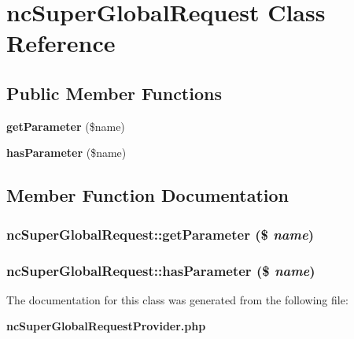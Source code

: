 \section{ncSuperGlobalRequest Class Reference}
\label{classncSuperGlobalRequest}
\subsection*{Public Member Functions}
\begin{CompactItemize}
\item 
{\bf getParameter} (\$name)
\item 
{\bf hasParameter} (\$name)
\end{CompactItemize}


\subsection{Member Function Documentation}
\subsubsection{\setlength{\rightskip}{0pt plus 5cm}ncSuperGlobalRequest::getParameter (\$ {\em name})}\label{classncSuperGlobalRequest_3265cae4ff3cd1e4a9bcc47d184a9b52}


\subsubsection{\setlength{\rightskip}{0pt plus 5cm}ncSuperGlobalRequest::hasParameter (\$ {\em name})}\label{classncSuperGlobalRequest_4693107c730c8532dc2c2597d59de309}




The documentation for this class was generated from the following file:\begin{CompactItemize}
\item 
{\bf ncSuperGlobalRequestProvider.php}\end{CompactItemize}
